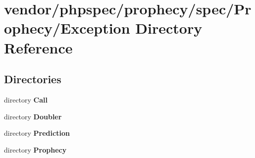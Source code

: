 \section{vendor/phpspec/prophecy/spec/\+Prophecy/\+Exception Directory Reference}
\label{dir_df96cd87e5641d8ebc4f6280a94ecccc}
\subsection*{Directories}
\begin{DoxyCompactItemize}
\item 
directory {\bf Call}
\item 
directory {\bf Doubler}
\item 
directory {\bf Prediction}
\item 
directory {\bf Prophecy}
\end{DoxyCompactItemize}
